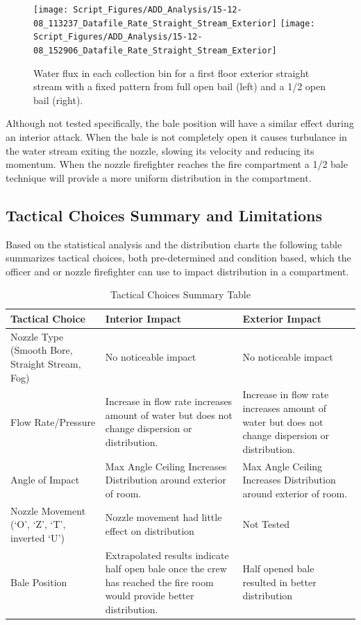 \documentclass[12pt,oneside]{book}
\begin{document}
\begin{figure}[ht]
\texttt{[image: Script\_Figures/ADD\_Analysis/15-12-08\_113237\_Datafile\_Rate\_Straight\_Stream\_Exterior]}
\texttt{[image: Script\_Figures/ADD\_Analysis/15-12-08\_152906\_Datafile\_Rate\_Straight\_Stream\_Exterior]} \\ 
\caption[Water Flux Varying Bale Opening Straight Stream]{Water flux in each collection bin for a first floor exterior straight stream with a fixed pattern from full open bail (left) and a 1/2 open bail (right).}
\label{fig:SS_Exterior_First_Floor_Varying_Bail}
\end{figure}

Although not tested specifically, the bale position will have a similar effect during an interior attack. When the bale is not completely open it causes turbulance in the water stream exiting the nozzle, slowing its velocity and reducing its momentum. When the nozzle firefighter reaches the fire compartment a 1/2 bale technique will provide a more uniform distribution in the compartment. 

\clearpage

\subsection{Tactical Choices Summary and Limitations}

Based on the statistical analysis and the distribution charts the following table summarizes tactical choices, both pre-determined and condition based, which the officer and or nozzle firefighter can use to impact distribution in a compartment.

\begin{table}[!ht]
\renewcommand{\arraystretch}{1.8}
\centering
\caption{Tactical Choices Summary Table}
\label{tab:tac_choice}
\begin{tabular}{L{4.5cm}L{4.5cm}L{4.5cm}}
\toprule[1.5pt]
Tactical Choice                                 & Interior Impact      & Exterior Impact \\
\midrule
Nozzle Type (Smooth Bore, Straight Stream, Fog) & No noticeable impact & No noticeable impact \\ 
Flow Rate/Pressure                              & Increase in flow rate increases amount of water but does not change dispersion or distribution. & Increase in flow rate increases amount of water but does not change dispersion or distribution. \\ 
Angle of Impact                                 & Max Angle Ceiling Increases Distribution around exterior of room.  & Max Angle Ceiling Increases Distribution around exterior of room. \\ 
Nozzle Movement (`O', `Z', `T', inverted `U')   & Nozzle movement had little effect on distribution & Not Tested \\ 
Bale Position                                   & Extrapolated results indicate half open bale once the crew has reached the fire room would provide better distribution. & Half opened bale resulted in better distribution \\
\bottomrule[1.25pt]
\end{tabular}
\end{table}
\end{document}
